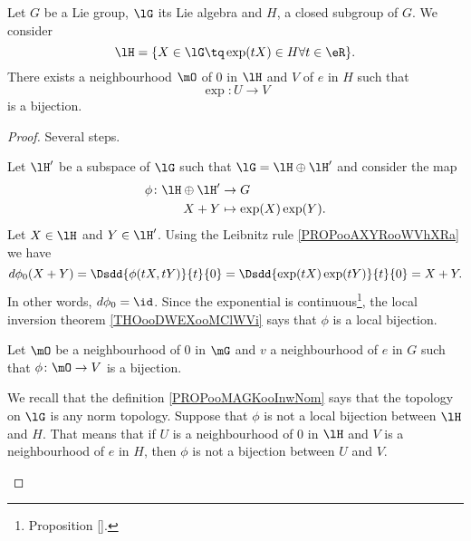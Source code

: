 \begin{lemma}     \label{LEMooNPLBooBrwNWY}
    Let \( G\) be a Lie group, \( \lG\) its Lie algebra and \( H\), a closed subgroup of \( G\). We consider
    \begin{equation}
        \lH=\{ X\in \lG\tq \exp(tX)\in H\forall t\in \eR \}.
    \end{equation}
    There exists a neighbourhood \( \mO\) of \( 0\) in \( \lH\) and \( V\) of \( e\) in \( H\) such that 
    \begin{equation}
        \exp\colon U\to V
    \end{equation}
    is  a bijection.
\end{lemma}

\begin{proof}
    Several steps.
    \begin{subproof}
    Let \( \lH'\) be a subspace of \( \lG\) such that \( \lG=\lH\oplus\lH'\) and consider the map
    \begin{equation}
        \begin{aligned}
            \phi\colon \lH\oplus\lH'&\to G \\
            X+Y&\mapsto \exp(X)\exp(Y). 
        \end{aligned}
    \end{equation}
    Let \( X\in \lH\) and \( Y\in \lH'\). Using the Leibnitz rule \ref{PROPooAXYRooWVhXRa} we have
    \begin{equation}
        d\phi_0(X+Y)=\Dsdd{ \phi(tX,tY) }{t}{0}=\Dsdd{ \exp(tX)\exp(tY) }{t}{0}=X+Y.
    \end{equation}
    In other words, \( d\phi_0=\id\). Since the exponential is continuous\footnote{Proposition \ref{}.}, the local inversion theorem \ref{THOooDWEXooMClWVi} says that \( \phi\) is a local bijection.

    Let \( \mO\) be a neighbourhood of \( 0\) in \( \mG\) and \( v\) a neighbourhood of \( e\) in \( G\) such that \( \phi\colon \mO\to V\) is a bijection.


    We recall that the definition \ref{PROPooMAGKooInwNom} says that the topology on \( \lG\) is any norm topology. Suppose that \( \phi\) is not a local bijection between \( \lH\) and \( H\). That means that if \( U\) is a neighbourhood of \( 0\) in \( \lH\) and \( V\) is a neighbourhood of \( e\) in \( H\), then \( \phi\) is not a bijection between \( U\) and \( V\).


\end{subproof}
\end{proof}
